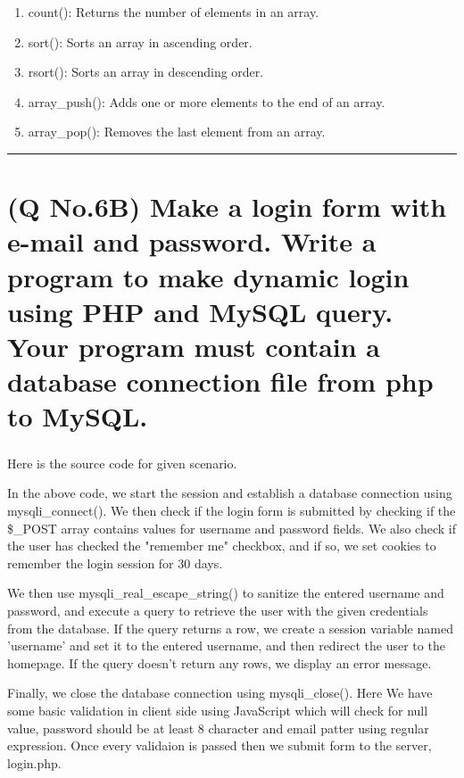 \documentclass[11pt]{article}
\begin{document}
\begin{enumerate}
    \item count(): Returns the number of elements in an array.
    \item sort(): Sorts an array in ascending order.
    \item rsort(): Sorts an array in descending order.
    \item array\_push(): Adds one or more elements to the end of an array.
    \item array\_pop(): Removes the last element from an array.
\end{enumerate}


\noindent\rule{\linewidth}{0.4pt}
\section{(Q No.6B) Make a login form with e-mail and password. Write a program to make dynamic login using PHP and MySQL query. Your program must contain a database connection file from php to MySQL.} 
\subparagraph{}
Here is the source code for given scenario.






In the above code, we start the session and establish a database connection using mysqli\_connect(). We then check if the login form is submitted by checking if the \$\_POST array contains values for username and password fields. We also check if the user has checked the "remember me" checkbox, and if so, we set cookies to remember the login session for 30 days.

We then use mysqli\_real\_escape\_string() to sanitize the entered username and password, and execute a query to retrieve the user with the given credentials from the database. If the query returns a row, we create a session variable named 'username' and set it to the entered username, and then redirect the user to the homepage. If the query doesn't return any rows, we display an error message.

Finally, we close the database connection using mysqli\_close().
Here We have some basic validation in client side using JavaScript which will check for null value, password should be at least 8 character and email patter using regular expression. Once every validaion is passed then we submit form to the server, login.php. 
\end{document}
